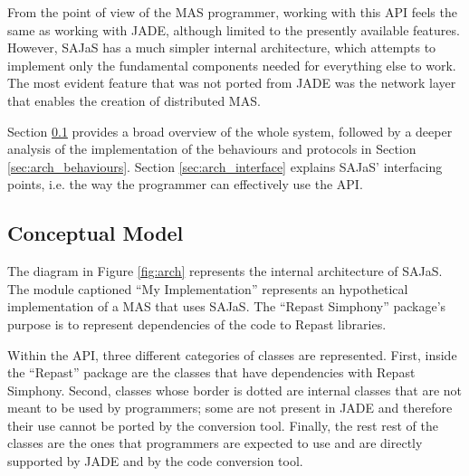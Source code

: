 From the point of view of the MAS programmer, working with this API feels the same as working with JADE, although limited to the presently available features. However, SAJaS has a much simpler internal architecture, which attempts to implement only the fundamental components needed for everything else to work. The most evident feature that was not ported from JADE was the network layer that enables the creation of distributed MAS.

Section \ref{sec:arch_conceptual} provides a broad overview of the whole system, followed by a deeper analysis of the implementation of the behaviours and protocols in Section \ref{sec:arch_behaviours}. Section \ref{sec:arch_interface} explains SAJaS' interfacing points, i.e. the way the programmer can effectively use the API.

\subsection{Conceptual Model}
\label{sec:arch_conceptual}
The diagram in Figure \ref{fig:arch} represents the internal architecture of SAJaS. The module captioned ``My Implementation'' represents an hypothetical implementation of a MAS that uses SAJaS. The ``Repast Simphony'' package's purpose is to represent dependencies of the code to Repast libraries.

Within the API, three different categories of classes are represented. First, inside the ``Repast'' package are the classes that have dependencies with Repast Simphony. Second, classes whose border is dotted are internal classes that are not meant to be used by programmers; some are not present in JADE and therefore their use cannot be ported by the conversion tool. Finally, the rest rest of the classes are the ones that programmers are expected to use and are directly supported by JADE and by the code conversion tool.

